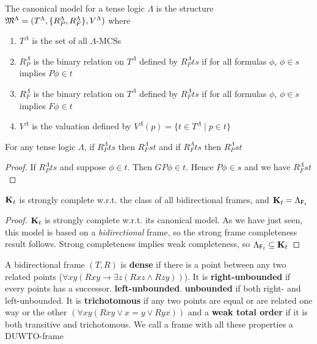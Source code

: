 \documentclass[11pt]{article}
\begin{document}
\begin{definition}[]
The canonical model for a tense logic \(\Lambda\) is the structure
\(\mathfrak{M}^\Lambda=(T^\Lambda,\{R_P^\Lambda,R_F^\Lambda\},V^\Lambda)\) where
\begin{enumerate}
\item \(T^\Lambda\) is the set of all \(\Lambda\)-MCSs
\item \(R_P^\Lambda\) is the binary relation on \(T^\Lambda\) defined by
\(R_P^\Lambda ts\) if for all formulas \(\phi\), \(\phi\in s\) implies \(P\phi\in t\)
\item \(R_F^\Lambda\) is the binary relation on \(T^\Lambda\) defined by
\(R_F^\Lambda ts\) if for all formulas \(\phi\), \(\phi\in s\) implies \(F\phi\in t\)
\item \(V^\Lambda\) is the valuation defined by \(V^\Lambda(p)=\{t\in T^\Lambda\mid
      p\in t\}\)
\end{enumerate}
\end{definition}

\begin{lemma}[]
\label{lemma4.35}
For any tense logic \(\Lambda\), if \(R_P^\Lambda ts\) then \(R_F^\Lambda st\) and if
\(R_F^\Lambda ts\) then \(R_P^\Lambda st\)
\end{lemma}

\begin{proof}
If \(R_P^\Lambda ts\) and suppose \(\phi\in t\). Then \(GP\phi \in t\). Hence
\(P\phi\in s\) and we have \(R_F^\Lambda st\)
\end{proof}

\begin{corollary}[]
\(\operatorname{\textbf{K}}_t\) is strongly complete w.r.t. the class of all bidirectional frames,
and \(\operatorname{\textbf{K}}_t=\Lambda_{\textsf{F}_t}\)
\end{corollary}

\begin{proof}
\(\operatorname{\textbf{K}}_t\) is strongly complete w.r.t. its canonical model. As we have just
seen, this model is based on a \emph{bidirectional} frame, so the strong frame
completeness result follows. Strong completeness implies weak completeness,
so \(\Lambda_{\textsf{F}_t}\subseteq\operatorname{\textbf{K}}_t\)
\end{proof}

\begin{definition}[]
A bidirectional frame \((T,R)\) is \textbf{dense} if there is a point between any two
related points (\(\forall xy(Rxy\to\exists z(Rxz\wedge Rzy))\)).
It is \textbf{right-unbounded} if every points has a successor.
\textbf{left-unbounded}. \textbf{unbounded} if both right- and left-unbounded. It is
\textbf{trichotomous} if any two points are equal or are related one way or the other
\((\forall xy(Rxy \vee x=y\vee Ryx))\) and a \textbf{weak total order} if it is both
transitive and trichotomous. We call a frame with all these properties a DUWTO-frame
\end{definition}
\end{document}
